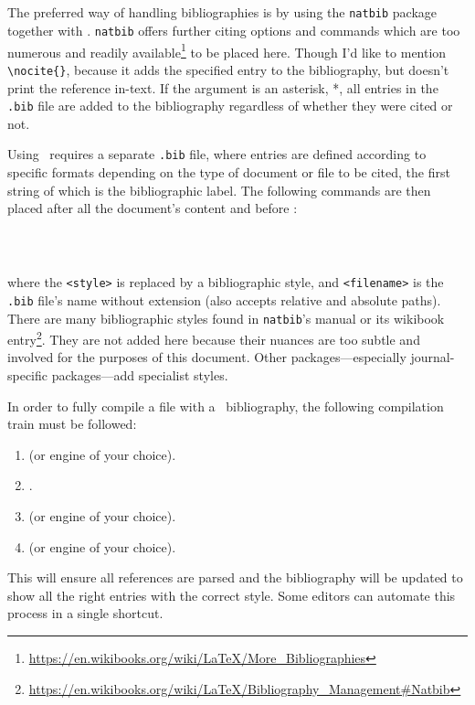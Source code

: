 \subsection{\BibTeX}\label{sb:bib}
%
The preferred way of handling bibliographies is by using the \verb|natbib| package together with \BibTeX. \verb|natbib| offers further citing options and commands which are too numerous and readily available\footnote{\url{https://en.wikibooks.org/wiki/LaTeX/More_Bibliographies}} to be placed here. Though I'd like to mention \verb|\nocite{}|, because it adds the specified entry to the bibliography, but doesn't print the reference in-text. If the argument is an asterisk, *, all entries in the \verb|.bib| file are added to the bibliography regardless of whether they were cited or not.

Using \BibTeX~requires a separate \verb|.bib| file, where entries are defined according to specific formats depending on the type of document or file to be cited, the first string of which is the bibliographic label. The following commands are then placed after all the document's content and before \verb||:
\begin{verbatim}
    
    
\end{verbatim}
where the \verb|<style>| is replaced by a bibliographic style, and \verb|<filename>| is the \verb|.bib| file's name without extension (also accepts relative and absolute paths). There are many bibliographic styles found in \verb|natbib|'s manual or its wikibook entry\footnote{\url{https://en.wikibooks.org/wiki/LaTeX/Bibliography_Management\#Natbib}}. They are not added here because their nuances are too subtle and involved for the purposes of this document. Other packages---especially journal-specific packages---add specialist styles.

In order to fully compile a file with a \BibTeX~bibliography, the following compilation train must be followed:
\begin{enumerate}
    \item \XeLaTeX (or engine of your choice).
    \item \BibTeX.
    \item \XeLaTeX (or engine of your choice).
    \item \XeLaTeX (or engine of your choice).
\end{enumerate}
This will ensure all references are parsed and the bibliography will be updated to show all the right entries with the correct style. Some editors can automate this process in a single shortcut.
%